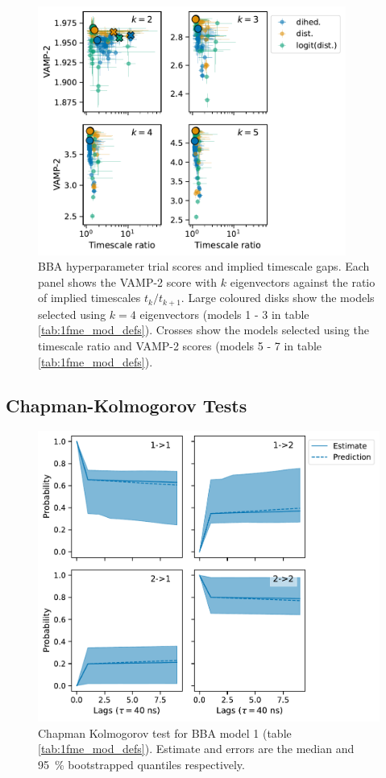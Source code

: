 \documentclass{article}
\begin{document}
\clearpage
\begin{figure}
    \centering
    \includegraphics[width=0.9\textwidth]{figures/vamp_scores/BBA_vamp_vs_gap.pdf}
    \caption{BBA hyperparameter trial scores and implied timescale gaps.  Each panel shows the VAMP-2 score with $k$ eigenvectors against the ratio of implied timescales $t_{k}/t_{k+1}$. Large coloured disks show the models selected using $k=4$ eigenvectors (models 1 - 3 in table \ref{tab:1fme_mod_defs}).  Crosses show the models selected using the timescale ratio and VAMP-2 scores (models 5 - 7 in table \ref{tab:1fme_mod_defs}).}
    \label{fig:bba_vamp_var_k}
\end{figure}


\clearpage
\subsection{Chapman-Kolmogorov Tests}

\begin{figure}[h]
    \centering
    \includegraphics[height=0.4\textheight]{figures/cktests/bba/m1_dihed_hpix47_cktest.pdf}
    \caption{Chapman Kolmogorov test for BBA model 1 (table \ref{tab:1fme_mod_defs}). Estimate and errors are the median and \SI{95}{\percent} bootstrapped quantiles respectively.}
    \label{fig:cktest_bba_1}
\end{figure}
\end{document}
